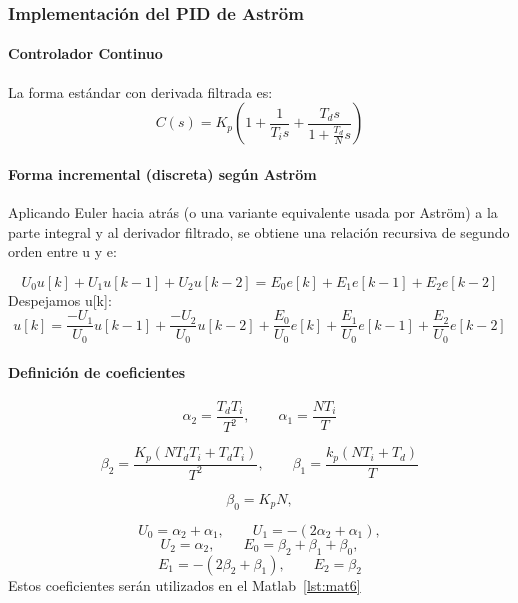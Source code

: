 \subsubsection{Implementación del PID de Astr\"om}

\paragraph{Controlador Continuo}

La forma estándar con derivada filtrada es:
\begin{equation}
	C(s)=K_p(1+\frac{1}{T_is}+\frac{T_ds}{1+\frac{T_d}{N}s})
\end{equation}

\paragraph{Forma incremental (discreta) según Astr\"om}
Aplicando Euler hacia atrás (o una variante equivalente usada por Astr\"om) a la parte integral y al derivador filtrado, se obtiene una relación recursiva de segundo orden entre u y e:

\[
	U_0u[k]+U_1u[k-1]+U_2u[k-2]=E_0e[k]+E_1e[k-1]+E_2e[k-2]
\]
Despejamos u[k]:
\begin{equation}
	u[k]=\frac{-U_1}{U_0}u[k-1]+\frac{-U_2}{U_0}u[k-2]+\frac{E_0}{U_0}e[k]+\frac{E_1}{U_0}e[k-1]+\frac{E_2}{U_0}e[k-2]
\end{equation}


\paragraph{Definición de coeficientes}
\[
	\alpha_2=\frac{T_dT_i}{T^2},	\qquad	\alpha_1=\frac{NT_i}{T}
\]

\[
	\beta_2=\frac{K_p(NT_dT_i+T_dT_i)}{T^2}, \qquad \beta_1=\frac{k_p(NT_i+T_d)}{T}
\]

\[
	\beta_0=K_pN,
\]

\[
	U_0=\alpha_2+\alpha_1, \qquad U_1=-(2\alpha_2+\alpha_1),
\]
\[
	U_2=\alpha_2, \qquad E_0=\beta_2+\beta_1+\beta_0,
\]
\[
	E_1=-(2\beta_2+\beta_1), \qquad E_2=\beta_2
\]
Estos coeficientes serán utilizados en el Matlab~\ref{lst:mat6}
\onecolumn
